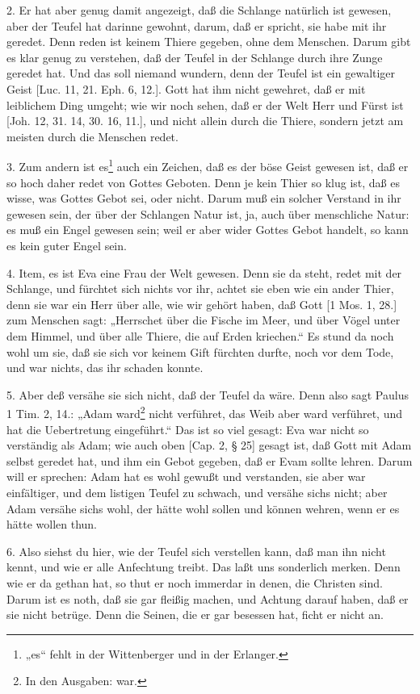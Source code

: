 2. Er hat aber genug damit angezeigt, daß die Schlange natürlich ist gewesen, aber der Teufel hat darinne gewohnt, darum, daß er spricht, sie habe mit ihr geredet. Denn reden ist keinem Thiere gegeben, ohne dem Menschen. Darum gibt es klar genug zu verstehen, daß der Teufel in der Schlange durch ihre Zunge geredet hat. Und das soll niemand wundern, denn der Teufel ist ein gewaltiger Geist [Luc. 11, 21. Eph. 6, 12.]. Gott hat ihm nicht gewehret, daß er mit leiblichem Ding umgeht; wie wir noch sehen, daß er der Welt Herr und Fürst ist [Joh. 12, 31. 14, 30. 16, 11.], und nicht allein durch die Thiere, sondern jetzt am meisten durch die Menschen redet.

3. Zum andern ist es\footnote{„es“ fehlt in der Wittenberger und in der Erlanger.} auch ein Zeichen, daß es der böse Geist gewesen ist, daß er so hoch daher redet von Gottes Geboten. Denn je kein Thier so klug ist, daß es wisse, was Gottes Gebot sei, oder nicht. Darum muß ein solcher Verstand in ihr gewesen sein, der über der Schlangen Natur ist, ja, auch über menschliche Natur: es muß ein Engel gewesen sein; weil er aber wider Gottes Gebot handelt, so kann es kein guter Engel sein.

4. Item, es ist Eva eine Frau der Welt gewesen. Denn sie da steht, redet mit der Schlange, und fürchtet sich nichts vor ihr, achtet sie eben wie ein ander Thier, denn sie war ein Herr über alle, wie wir gehört haben, daß Gott [1 Mos. 1, 28.] zum Menschen sagt: „Herrschet über die Fische im Meer, und über Vögel unter dem Himmel, und über alle Thiere, die auf Erden kriechen.“ Es stund da noch wohl um sie, daß sie sich vor keinem Gift fürchten durfte, noch vor dem Tode, und war nichts, das ihr schaden konnte.

5. Aber deß versähe sie sich nicht, daß der Teufel da wäre. Denn also sagt Paulus 1 Tim. 2, 14.: „Adam ward\footnote{In den Ausgaben: war.} nicht verführet, das Weib aber ward verführet, und hat die Uebertretung eingeführt.“ Das ist so viel gesagt: Eva war nicht so verständig als Adam; wie auch oben [Cap. 2, § 25] gesagt ist, daß Gott mit Adam selbst geredet hat, und ihm ein Gebot gegeben, daß er Evam sollte lehren. Darum will er sprechen: Adam hat es wohl gewußt und verstanden, sie aber war einfältiger, und dem listigen Teufel zu schwach, und versähe sichs nicht; aber Adam versähe sichs wohl, der hätte wohl sollen und können wehren, wenn er es hätte wollen thun.

6. Also siehst du hier, wie der Teufel sich verstellen kann, daß man ihn nicht kennt, und wie er alle Anfechtung treibt. Das laßt uns sonderlich merken. Denn wie er da gethan hat, so thut er noch immerdar in denen, die Christen sind. Darum ist es noth, daß sie gar fleißig machen, und Achtung darauf haben, daß er sie nicht betrüge. Denn die Seinen, die er gar besessen hat, ficht er nicht an.

